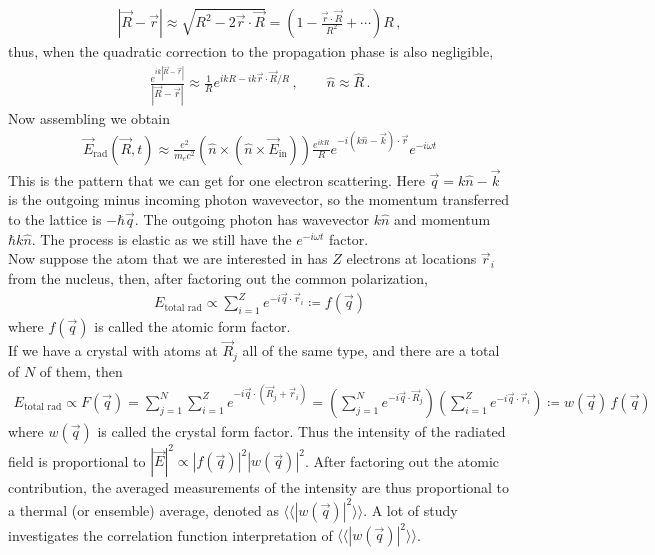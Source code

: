 \documentclass[11pt, oneside]{book}
\theoremstyle{break}
\theoremstyle{break}
\begin{document}
\begin{align*}
|\vec{R} - \vec{r}| \approx \sqrt{R^2 - 2\vec{r}\cdot \vec{R} } = \left( 1 - \frac{\vec{r}\cdot \vec{R}}{R^2} + \cdots \right)R\,,
\end{align*}
thus, when the quadratic correction to the propagation phase is also negligible,
\begin{align*}
\frac{e^{ik|\vec{R}-\vec{r}|}}{|\vec{R} - \vec{r}|} \approx \frac{1}{R}e^{ikR - ik \vec{r}\cdot \vec{R}/R}\,,\qquad \hat{n} \approx \hat{R}\,.
\end{align*}
Now assembling we obtain
\begin{align*}
\vec{E}_{\text{rad}}(\vec{R},t)\approx \frac{e^2}{m_e c^2}\left( \hat{n}\times (\hat{n}\times \vec{E}_{\text{in}}) \right) \frac{e^{ikR}}{R}	e^{-i (k\hat{n}- \vec{k})\cdot \vec{r}}e^{-i\omega t}
\end{align*}
This is the pattern that we can get for one electron scattering. Here $\vec{q} = k\hat{n} - \vec{k}$ is the outgoing minus incoming photon wavevector, so the momentum transferred to the lattice is $-\hbar\vec{q}$. The outgoing photon has wavevector $k\hat{n}$ and momentum $\hbar k\hat{n}$. The process is elastic as we still have the $e^{-i\omega t}$ factor. \\

Now suppose the atom that we are interested in has $Z$ electrons at locations $\vec{r}_i$ from the nucleus, then, after factoring out the common polarization, 
\begin{align*}
E_{\text{total rad}} \propto \sum_{i=1}^Z e^{-i\vec{q}\cdot \vec{r}_i} \coloneqq f(\vec{q})
\end{align*}
where $f(\vec{q})$ is called the atomic form factor. \\

If we have a crystal with atoms at $\vec{R}_j$ all of the same type, and there are a total of $N$ of them, then 
\begin{align*}
 E_{\text{total rad}} \propto F(\vec{q}) = \sum_{j=1}^N \sum_{i=1}^Z e^{-i\vec{q}\cdot \left(\vec{R}_j + \vec{r}_i\right)} = \left(
\sum_{j=1}^N e^{-i\vec{q}\cdot \vec{R}_j}
\right)\left(
\sum_{i=1}^Z e^{-i \vec{q}\cdot \vec{r}_i}
\right)\coloneqq w(\vec{q}) \, f(\vec{q})
\end{align*}
where $w(\vec{q})$ is called the crystal form factor. Thus the intensity of the radiated field is proportional to $|\vec{E}|^2 \propto |f(\vec{q})|^2|w(\vec{q})|^2$. After factoring out the atomic contribution, the averaged measurements of the intensity are thus proportional to a thermal (or ensemble) average, denoted as $\langle\langle |w(\vec{q})|^2\rangle\rangle$. A lot of study investigates the correlation function interpretation of $\langle\langle |w(\vec{q})|^2\rangle\rangle$. \\
\end{document}
